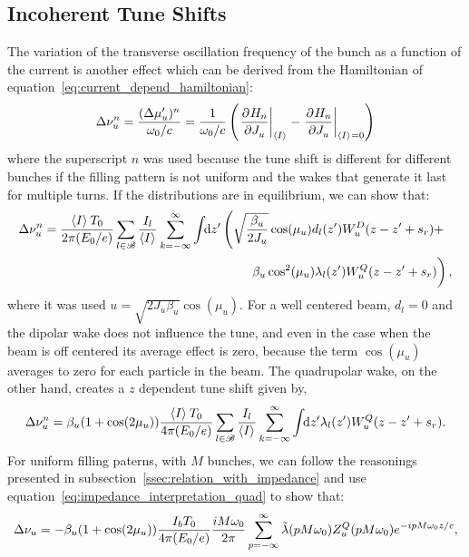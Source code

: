 \subsection{Incoherent Tune Shifts}\label{sec:incoherent_tune_shift}

    The variation of the transverse oscillation frequency of the bunch as a function of the current is another effect which can be derived from the Hamiltonian of equation~\eqref{eq:current_depend_hamiltonian}:
    \begin{align}
        \Delta\nu_u^n = \frac{(\Delta\mu'_u)^n}{\omega_0/c} = \frac{1}{\omega_0/c}\left(\left.\frac{\partial^{{}}H_n}{\partial J_u^{{}}}\right|_{\left\langle I \right\rangle_{{}}} - \left.\frac{\partial^{{}}H_n}{\partial J_u^{{}}}\right|_{\left\langle I \right\rangle_{{}}=0}\right)
    \end{align}
    where the superscript $n$ was used because the tune shift is different for different bunches if the filling pattern is not uniform and the wakes that generate it last for multiple turns. If the distributions are in equilibrium, we can show that:
    \begin{align}
        \Delta\nu_u^n = \frac{\average{I}T_0}{2\pi(E_0/e)}
        \sum_{l\in\mathscr{B}}\frac{I_l}{\average{I}}\sum_{k=-\infty}^\infty\udefint{z'}{
        &\left(\sqrt{\frac{\beta_u}{2J_u}}\cos(\mu_u)d_l(z') W^D_u(z-z' + s_r) +\right.\\
        &\left.\phantom{\sqrt{\frac{1_1}{1_1}}}\beta_u\cos^2(\mu_u)\lambda_l(z') W^Q_u(z-z' + s_r)\right)},
    \end{align}
    where it was used $u = \sqrt{2J_u\beta_u}\cos(\mu_u)$. For a well centered beam, $d_l=0$ and the dipolar wake does not influence the tune, and even in the case when the beam is off centered its average effect is zero, because the term $\cos(\mu_u)$ averages to zero for each particle in the beam. The quadrupolar wake, on the other hand, creates a $z$ dependent tune shift given by,
    \begin{align}
        \Delta\nu_u^n = \beta_u(1+\cos(2\mu_u))\frac{\left\langle I \right\rangle_{{}}T_0}{4\pi(E_0/e)}
        \sum_{l\in\mathscr{B}}\frac{I_l}{\left\langle I \right\rangle_{{}}}\sum_{k=-\infty}^\infty\int\!\!\text{d}z' 
        \lambda_l(z') W^Q_u(z-z' + s_r).
    \end{align}
    For uniform filling paterns, with $M$ bunches, we can follow the reasonings presented in subsection~\ref{ssec:relation_with_impedance} and use equation~\eqref{eq:impedance_interpretation_quad} to show that:
    \begin{align}
        \Delta\nu_u = -\beta_u(1+\cos(2\mu_u))\frac{I_bT_0}{4\pi(E_0/e)}
        \frac{iM\omega_0}{2\pi} \sum_{p=-\infty}^\infty \tilde{\lambda}(pM\omega_0)Z^Q_u(pM\omega_0)e^{-ipM\omega_0 z/c},
    \end{align}
